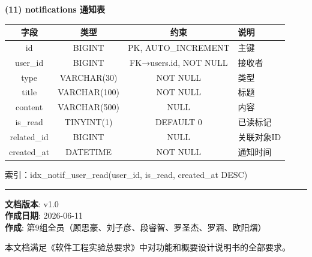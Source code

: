 \documentclass[12pt,a4paper]{ctexart}
\numberwithin{figure}{section}
\numberwithin{table}{section}
\begin{document}
\textbf{(11) notifications 通知表}

\begin{center}
\renewcommand{\arraystretch}{1.3}
\small
\begin{tabular}{|c|c|c|p{5cm}|}
\hline
\rowcolor{tableheader}
\textbf{字段} & \textbf{类型} & \textbf{约束} & \textbf{说明} \\
\hline
id & BIGINT & PK, AUTO\_INCREMENT & 主键 \\
\hline
user\_id & BIGINT & FK→users.id, NOT NULL & 接收者 \\
\hline
type & VARCHAR(30) & NOT NULL & 类型 \\
\hline
title & VARCHAR(100) & NOT NULL & 标题 \\
\hline
content & VARCHAR(500) & NULL & 内容 \\
\hline
is\_read & TINYINT(1) & DEFAULT 0 & 已读标记 \\
\hline
related\_id & BIGINT & NULL & 关联对象ID \\
\hline
created\_at & DATETIME & NOT NULL & 通知时间 \\
\hline
\end{tabular}
\end{center}

索引：idx\_notif\_user\_read(user\_id, is\_read, created\_at DESC)

\vspace{2em}

\begin{center}
\rule{0.6\textwidth}{0.4pt}
\end{center}

\begin{center}
\textbf{文档版本}: v1.0 \\
\textbf{作成日期}: 2026-06-11 \\
\textbf{作成}: 第9组全员（顾思豪、刘子彦、段睿智、罗圣杰、罗涵、欧阳熠）

\vspace{1em}

本文档满足《软件工程实验总要求》中对功能和概要设计说明书的全部要求。
\end{center}
\end{document}
